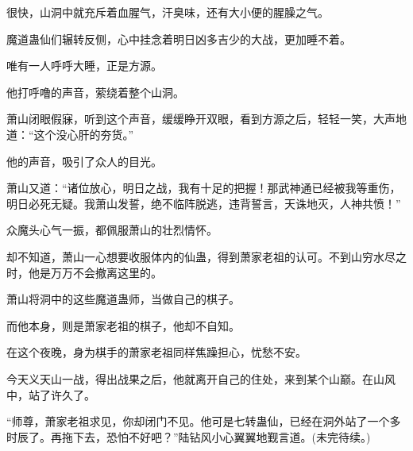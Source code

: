 \begin{this_body}
很快，山洞中就充斥着血腥气，汗臭味，还有大小便的腥臊之气。

魔道蛊仙们辗转反侧，心中挂念着明日凶多吉少的大战，更加睡不着。

唯有一人呼呼大睡，正是方源。

他打呼噜的声音，萦绕着整个山洞。

萧山闭眼假寐，听到这个声音，缓缓睁开双眼，看到方源之后，轻轻一笑，大声地道：“这个没心肝的夯货。”

他的声音，吸引了众人的目光。

萧山又道：“诸位放心，明日之战，我有十足的把握！那武神通已经被我等重伤，明日必死无疑。我萧山发誓，绝不临阵脱逃，违背誓言，天诛地灭，人神共愤！”

众魔头心气一振，都佩服萧山的壮烈情怀。

却不知道，萧山一心想要收服体内的仙蛊，得到萧家老祖的认可。不到山穷水尽之时，他是万万不会撤离这里的。

萧山将洞中的这些魔道蛊师，当做自己的棋子。

而他本身，则是萧家老祖的棋子，他却不自知。

在这个夜晚，身为棋手的萧家老祖同样焦躁担心，忧愁不安。

今天义天山一战，得出战果之后，他就离开自己的住处，来到某个山巅。在山风中，站了许久了。

“师尊，萧家老祖求见，你却闭门不见。他可是七转蛊仙，已经在洞外站了一个多时辰了。再拖下去，恐怕不好吧？”陆钻风小心翼翼地觐言道。(未完待续。)

\end{this_body}

